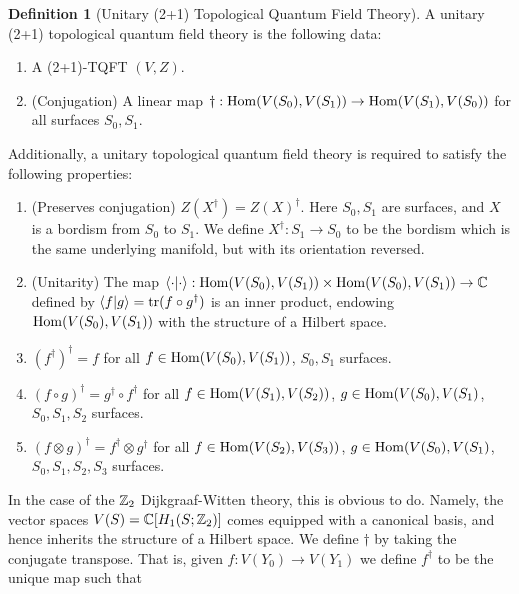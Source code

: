 \documentclass{article}
\theoremstyle{definition}
\newtheorem*{definition}{Definition}
\numberwithin{figure}{section}
\begin{document}
\begin{definition}[Unitary (2+1) Topological Quantum Field Theory] A unitary (2+1) topological quantum field theory is the following data:

\begin{enumerate}
\item A (2+1)-TQFT $(V,Z)$.
\item (Conjugation) A linear map $\dagger: \mathrm{Hom}(V(S_0),V(S_1))\to \mathrm{Hom}(V(S_1),V(S_0))$ for all surfaces $S_0,S_1$.
\end{enumerate}

Additionally, a unitary topological quantum field theory is required to satisfy the following properties:

\begin{enumerate}

\item (Preserves conjugation) $Z\left(X^{\dagger}\right)=Z(X)^{\dagger}$. Here $S_0,S_1$ are surfaces, and $X$ is a bordism from $S_0$ to $S_1$. We define $X^{\dagger}:S_1\to S_0$ to be the bordism which is the same underlying manifold, but with its orientation reversed.

\item (Unitarity) The map $\left<\cdot|\cdot \right>: \mathrm{Hom}(V(S_0),V(S_1))\times \mathrm{Hom}(V(S_0),V(S_1))\to \mathbb{C}$ defined by $\left<f|g\right>=\mathrm{tr}(f\circ g^\dagger)$ is an inner product, endowing $\mathrm{Hom}(V(S_0),V(S_1))$ with the structure of a Hilbert space.

\item $(f^{\dagger})^{\dagger}=f$ for all $f\in \mathrm{Hom}(V(S_0),V(S_1))$, $S_0,S_1$ surfaces.

\item $(f\circ g)^{\dagger}=g^{\dagger}\circ f^{\dagger}$ for all $f\in \mathrm{Hom}(V(S_1),V(S_2))$, $g\in \mathrm{Hom}(V(S_0),V(S_1)$, $S_0,S_1,S_2$ surfaces.

\item $(f\otimes g)^{\dagger}=f^{\dagger}\otimes g^{\dagger}$ for all $f\in \mathrm{Hom}(V(S_2),V(S_3))$, $g\in \mathrm{Hom}(V(S_0),V(S_1)$, $S_0,S_1,S_2,S_3$ surfaces.
\end{enumerate}
\raggedleft\qedsymbol{}
\end{definition}

In the case of the $\mathbb{Z}_2$ Dijkgraaf-Witten theory, this is obvious to do. Namely, the vector spaces $V(S)=\mathbb{C}[H_1(S;\mathbb{Z}_2)]$ comes equipped with a canonical basis, and hence inherits the structure of a Hilbert space. We define $\dagger$ by taking the conjugate transpose. That is, given $f: V(Y_0)\to V(Y_1)$ we define $f^{\dagger}$ to be the unique map such that
\end{document}
